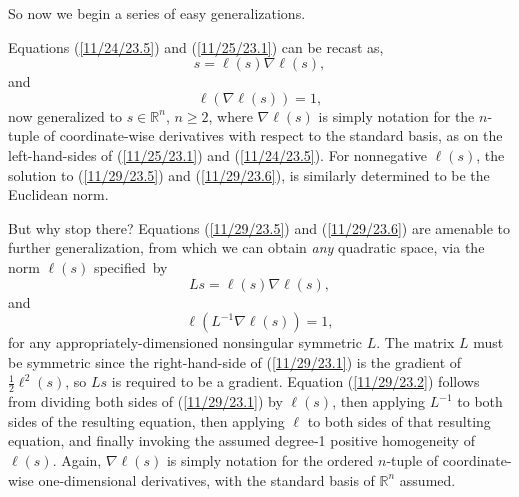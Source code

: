 \documentclass{amsart}
\numberwithin{equation}{section}
\theoremstyle{definition}
\numberwithin{theorem}{section}
\begin{document}
  
So now we begin a series of easy generalizations.  

Equations (\ref{11/24/23.5}) and (\ref{11/25/23.1}) can be recast as, \begin{equation}\label{11/29/23.5} s = \ell(s)\nabla\ell(s),\end{equation} and\begin{equation}\label{11/29/23.6}\ell\left(\nabla\ell(s)\right) = 1,\end{equation} now generalized to $s\in \mathbb{R}^n$, $n\ge 2$, where $\nabla\ell(s)$ is simply notation for the $n$-tuple of coordinate-wise derivatives with respect to the standard basis, as on the left-hand-sides of  (\ref{11/25/23.1}) and (\ref{11/24/23.5}).  For nonnegative $\ell(s)$, the solution to (\ref{11/29/23.5}) and (\ref{11/29/23.6}), is similarly determined to be the Euclidean norm.  

But why stop there?  Equations (\ref{11/29/23.5}) and (\ref{11/29/23.6}) are amenable to further generalization, from which  we can obtain {\it any} quadratic space, via the norm $\ell(s)$ \mbox{specified by} \begin{equation}\label{11/29/23.1} Ls = \ell(s)\nabla\ell(s),\end{equation} and \begin{equation}\label{11/29/23.2}\ell\left(L^{-1}\nabla\ell(s)\right) = 1,\end{equation} for any appropriately-dimensioned nonsingular symmetric $L$.  The matrix $L$ must be symmetric since the right-hand-side of (\ref{11/29/23.1}) is the gradient of $\frac{1}{2}\ell^2(s)$, so $Ls$ is required to be a gradient.  Equation (\ref{11/29/23.2}) follows from dividing both sides of (\ref{11/29/23.1}) by $\ell(s)$, then applying $L^{-1}$ to both sides of the resulting equation, then applying $\ell$ to both sides of that resulting equation, and finally invoking the assumed degree-1 positive homogeneity of $\ell(s)$. Again,  $\nabla\ell(s)$ is simply notation for the ordered $n$-tuple of  coordinate-wise one-dimensional derivatives, with the standard basis of $\mathbb{R}^n$ assumed.
  
\end{document}
